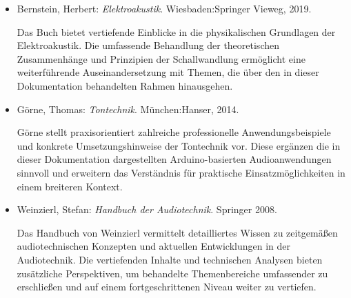 \begin{itemize}
	\item Bernstein, Herbert: \textsl{Elektroakustik}. Wiesbaden:Springer Vieweg, 2019. \cite{Bernstein:2019d}
		
	Das Buch bietet vertiefende Einblicke in die physikalischen Grundlagen der Elektroakustik. Die umfassende Behandlung der theoretischen Zusammenhänge und Prinzipien der Schallwandlung ermöglicht eine weiterführende Auseinandersetzung mit Themen, die über den in dieser Dokumentation behandelten Rahmen hinausgehen.
	
	\item Görne, Thomas: \textsl{Tontechnik}. München:Hanser, 2014. \cite{Görne:2014e}
	
	Görne stellt praxisorientiert zahlreiche professionelle Anwendungsbeispiele und konkrete Umsetzungshinweise der Tontechnik vor. Diese ergänzen die in dieser Dokumentation dargestellten Arduino-basierten Audioanwendungen sinnvoll und erweitern das Verständnis für praktische Einsatzmöglichkeiten in einem breiteren Kontext.
	
	\item Weinzierl, Stefan: \textsl{Handbuch der Audiotechnik}. Springer 2008. \cite{Weinzierl:2008}
	
	Das Handbuch von Weinzierl vermittelt detailliertes Wissen zu zeitgemäßen audiotechnischen Konzepten und aktuellen Entwicklungen in der Audiotechnik. Die vertiefenden Inhalte und technischen Analysen bieten zusätzliche Perspektiven, um behandelte Themenbereiche umfassender zu erschließen und auf einem fortgeschrittenen Niveau weiter zu vertiefen.
	
\end{itemize} 
